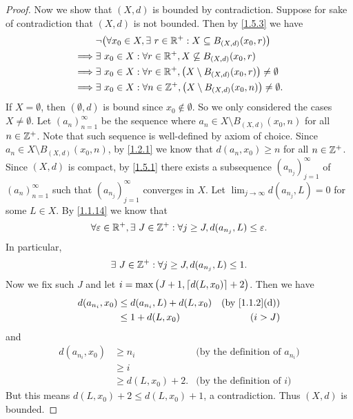 \begin{proof}
  Now we show that \((X, d)\) is bounded by contradiction.
  Suppose for sake of contradiction that \((X, d)\) is not bounded.
  Then by \cref{1.5.3} we have
  \begin{align*}
             & \lnot\big(\forall x_0 \in X, \exists\ r \in \mathbb{R}^+ : X \subseteq B_{(X, d)}(x_0, r)\big)            \\
    \implies & \exists\ x_0 \in X : \forall r \in \mathbb{R}^+, X \not\subseteq B_{(X, d)}(x_0, r)                       \\
    \implies & \exists\ x_0 \in X : \forall r \in \mathbb{R}^+, \big(X \setminus B_{(X, d)}(x_0, r)\big) \neq \emptyset  \\
    \implies & \exists\ x_0 \in X : \forall n \in \mathbb{Z}^+, \big(X \setminus B_{(X, d)}(x_0, n)\big) \neq \emptyset.
  \end{align*}
  If \(X = \emptyset\), then \((\emptyset, d)\) is bound since \(x_0 \notin \emptyset\).
  So we only considered the cases \(X \neq \emptyset\).
  Let \((a_n)_{n = 1}^\infty\) be the sequence where \(a_n \in X \setminus B_{(X, d)}(x_0, n)\) for all \(n \in \mathbb{Z}^+\).
  Note that such sequence is well-defined by axiom of choice.
  Since \(a_n \in X \setminus B_{(X, d)}(x_0, n)\), by \cref{1.2.1} we know that \(d(a_n, x_0) \geq n\) for all \(n \in \mathbb{Z}^+\).
  Since \((X, d)\) is compact, by \cref{1.5.1} there exists a subsequence \((a_{n_j})_{j = 1}^\infty\) of \((a_n)_{n = 1}^\infty\) such that \((a_{n_j})_{j = 1}^\infty\) converges in \(X\).
  Let \(\lim_{j \to \infty} d(a_{n_j}, L) = 0\) for some \(L \in X\).
  By \cref{1.1.14} we know that
  \[
    \forall \varepsilon \in \mathbb{R}^+, \exists\ J \in \mathbb{Z}^+ : \forall j \geq J, d(a_{n_j}, L) \leq \varepsilon.
  \]
  In particular,
  \[
    \exists\ J \in \mathbb{Z}^+ : \forall j \geq J, d(a_{n_j}, L) \leq 1.
  \]
  Now we fix such \(J\) and let \(i = \max\big(J + 1, \left\lceil d(L, x_0)\right\rceil + 2\big)\).
  Then we have
  \begin{align*}
    d(a_{n_i}, x_0) & \leq d(a_{n_i}, L) + d(L, x_0) & \text{(by \cref{1.1.2}(d))} \\
                    & \leq 1 + d(L, x_0)             & (i > J)
  \end{align*}
  and
  \begin{align*}
    d(a_{n_i}, x_0) & \geq n_i            & \text{(by the definition of \(a_{n_i}\))} \\
                    & \geq i                                                          \\
                    & \geq d(L, x_0) + 2. & \text{(by the definition of \(i\))}
  \end{align*}
  But this means \(d(L, x_0) + 2 \leq d(L, x_0) + 1\), a contradiction.
  Thus \((X, d)\) is bounded.
\end{proof}

